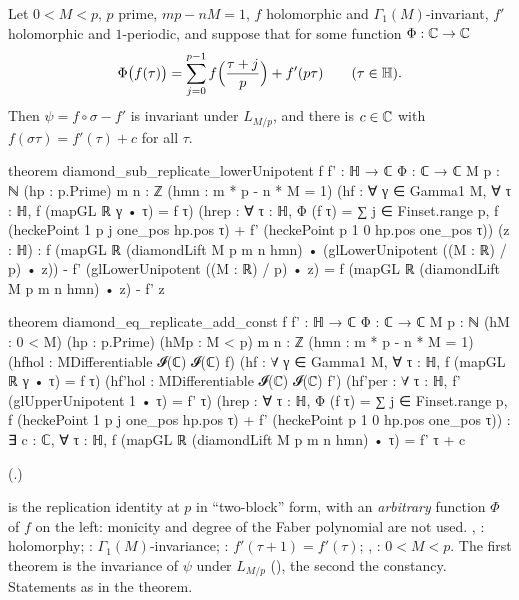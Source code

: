 \begin{theorem}\label{ch16:thm:diamondconst}
Let $0<M<p$, $p$ prime, $mp-nM=1$, $f$ holomorphic and $\Gamma_1(M)$-invariant, $f'$ holomorphic and $1$-periodic, and
suppose that for some function $\Phi:{\mathbb{C}}\to{\mathbb{C}}$
\begin{equation*}
  \Phi\bigl(f(\tau)\bigr)=\sum_{j=0}^{p-1}f\Bigl(\frac{\tau+j}p\Bigr)+f'(p\tau)\qquad(\tau\in\mathbb{H}).
\end{equation*}
Then $\psi=f\circ\sigma-f'$ is invariant under $L_{M/p}$, and there is $c\in{\mathbb{C}}$ with $f(\sigma\tau)=f'(\tau)+c$ for all
$\tau$.
\end{theorem}
\begin{leancode}
theorem diamond_sub_replicate_lowerUnipotent {f f' : ℍ → ℂ} {Φ : ℂ → ℂ} {M p : ℕ}
    (hp : p.Prime) {m n : ℤ} (hmn : m * p - n * M = 1)
    (hf : ∀ γ ∈ Gamma1 M, ∀ τ : ℍ, f (mapGL ℝ γ • τ) = f τ)
    (hrep : ∀ τ : ℍ, Φ (f τ) = ∑ j ∈ Finset.range p, f (heckePoint 1 p j one_pos hp.pos τ) +
      f' (heckePoint p 1 0 hp.pos one_pos τ)) (z : ℍ) :
    f (mapGL ℝ (diamondLift M p m n hmn) • (glLowerUnipotent ((M : ℝ) / p) • z)) -
        f' (glLowerUnipotent ((M : ℝ) / p) • z) =
      f (mapGL ℝ (diamondLift M p m n hmn) • z) - f' z

theorem diamond_eq_replicate_add_const {f f' : ℍ → ℂ} {Φ : ℂ → ℂ} {M p : ℕ} (hM : 0 < M)
    (hp : p.Prime) (hMp : M < p) {m n : ℤ} (hmn : m * p - n * M = 1)
    (hfhol : MDifferentiable 𝓘(ℂ) 𝓘(ℂ) f)
    (hf : ∀ γ ∈ Gamma1 M, ∀ τ : ℍ, f (mapGL ℝ γ • τ) = f τ)
    (hf'hol : MDifferentiable 𝓘(ℂ) 𝓘(ℂ) f')
    (hf'per : ∀ τ : ℍ, f' (glUpperUnipotent 1 • τ) = f' τ)
    (hrep : ∀ τ : ℍ, Φ (f τ) = ∑ j ∈ Finset.range p, f (heckePoint 1 p j one_pos hp.pos τ) +
      f' (heckePoint p 1 0 hp.pos one_pos τ)) :
    ∃ c : ℂ, ∀ τ : ℍ, f (mapGL ℝ (diamondLift M p m n hmn) • τ) = f' τ + c
\end{leancode}
(.)
\begin{dictionary}
 is the replication identity at $p$ in ``two-block'' form, with an \emph{arbitrary} function $\Phi$ of
$f$ on the left: monicity and degree of the Faber polynomial are not used.  , : holomorphy;
: $\Gamma_1(M)$-invariance; : $f'(\tau+1)=f'(\tau)$; , : $0<M<p$.  The first
theorem is the invariance of $\psi$ under $L_{M/p}$ (), the second the
constancy.  Statements as in the theorem.
\end{dictionary}
